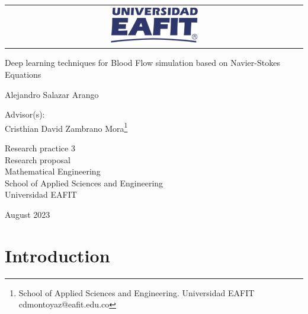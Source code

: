 \documentclass[12pt,letterpaper]{article}
\begin{document}
\begin{titlepage}

\Large
\sffamily

\begin{center}
  \begin{tabular}{c}
    \includegraphics[width=0.30\textwidth]{logo-eafit.png}
  \end{tabular}
\end{center}

\vfill
\begin{center}
  \LARGE Deep learning techniques for Blood Flow simulation based on Navier-Stokes Equations
\end{center}

\vspace*{1cm}
\centerline{\LARGE Alejandro Salazar Arango\footnotemark}  
\vfill

\begin{center}
Advisor(s): \\
Cristhian David Zambrano Mora\footnote{School of Applied Sciences and Engineering. Universidad EAFIT cdmontoyaz@eafit.edu.co}   \\
\end{center}

\vfill

\begin{center}
  \large
    Research practice 3 \\
  Research proposal \\
  Mathematical Engineering\\
  School of Applied Sciences and Engineering\\
  Universidad EAFIT \\
\end{center}

\vfill
\centerline{August 2023}
\vspace*{0.7cm}
\end{titlepage}


\section{Introduction}
\end{document}
